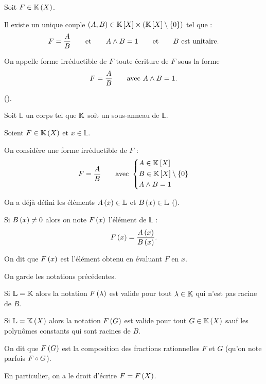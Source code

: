 \begin{defprop}
Soit \(F\in\fracrat\).

Il existe un unique couple \(\paren{A,B}\in\poly\times\paren{\poly\excluant\accol{0}}\) tel que : \[F=\dfrac{A}{B}\qquad\text{et}\qquad A\land B=1\qquad\text{et}\qquad B\text{ est unitaire}.\]

On appelle forme irréductible de \(F\) toute écriture de \(F\) sous la forme \[F=\dfrac{A}{B}\qquad\text{avec }A\land B=1.\]
\end{defprop}

\begin{dem}
 (\cf {}).
\end{dem}

\begin{nota}
\renewcommand{\L}{\mathbb{L}}
Soit \(\L\) un corps tel que \(\mathbb{K}\) soit un sous-anneau de \(\L\).

Soient \(F\in\fracrat\) et \(x\in\L\).

On considère une forme irréductible de \(F\) : \[F=\dfrac{A}{B}\qquad\text{avec }\begin{dcases}A\in\poly \\ B\in\poly\excluant\accol{0} \\ A\et B=1\end{dcases}\]

On a déjà défini les éléments \(A\paren{x}\in\L\) et \(B\paren{x}\in\L\) (\cf {}).

Si \(B\left(x\right)\not=0\) alors on note \(F\left(x\right)\) l'élément de \(\L\) : \[F\left(x\right)=\dfrac{A\left(x\right)}{B\left(x\right)}.\]

On dit que \(F\left(x\right)\) est l'élément obtenu en évaluant \(F\) en \(x\).
\end{nota}

\begin{ex}
\renewcommand{\L}{\mathbb{L}}

On garde les notations précédentes.

Si \(\L=\K\) alors la notation \(F\left(\lambda\right)\) est valide pour tout \(\lambda\in\mathbb{K}\) qui n'est pas racine de \(B\).

Si \(\L=\fracrat\) alors la notation \(F\left(G\right)\) est valide pour tout \(G\in\fracrat\) sauf les polynômes constants qui sont racines de \(B\).

On dit que \(F\left(G\right)\) est la composition des fractions rationnelles \(F\) et \(G\) (qu'on note parfois \(F\circ G\)).

En particulier, on a le droit d'écrire \(F=F\left(X\right)\).
\end{ex}

